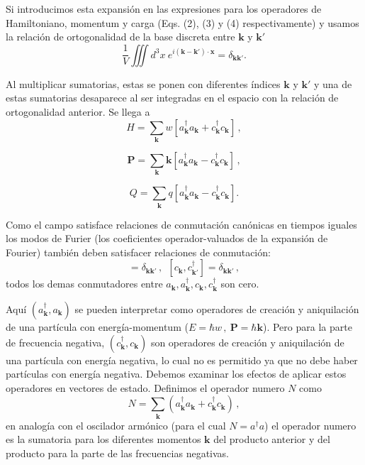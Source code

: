 \documentclass{article}
\begin{document}
Si introducimos esta expansión en las expresiones para los operadores de Hamiltoniano, momentum y carga (Eqs. (2), (3) y (4) respectivamente) y usamos la relación de ortogonalidad de la base discreta entre $\mathbf{k}$ y $\mathbf{k'}$
%
\begin{equation}
  \frac{1}{V}\iiint  d^3x \   e^{i(\mathbf{k}-\mathbf{k'}) \cdot \mathbf{x}}=\delta_{\mathbf{kk'}}.
\end{equation}

Al multiplicar sumatorias, estas se ponen con diferentes índices $\mathbf{k}$ y $\mathbf{k'}$ y una de estas sumatorias desaparece al ser integradas en el espacio con la relación de ortogonalidad anterior. Se llega a 
%
\begin{equation}
  H = \sum_{\mathbf{k}} w[a_{\mathbf{k}}^\dagger a_{\mathbf{k}} + c_{\mathbf{k}}^\dagger c_{\mathbf{k}} ]\,,
\end{equation}

\begin{equation}
  \mathbf{P} = \sum_{{\mathbf{k}}} \mathbf{k}[a_{\mathbf{k}}^\dagger a_{\mathbf{k}} - c_{\mathbf{k}}^\dagger c_{\mathbf{k}} ]\,,
\end{equation}

\begin{equation}
  Q = \sum_{{\mathbf{k}}} q[a_{\mathbf{k}}^\dagger a_{\mathbf{k}} - c_{\mathbf{k}}^\dagger c_{\mathbf{k}} ].
\end{equation}

Como el campo satisface  relaciones de conmutación canónicas en tiempos iguales los modos de Furier (los coeficientes operador-valuados de la expansión de Fourier) también deben satisfacer relaciones de conmutación:
%
\begin{equation}
  [a_{\mathbf{k}},a_{{\mathbf{k}}'}^\dagger] = \delta_{\mathbf{kk'}}\,, \ \  [c_{\mathbf{k}},c_{{\mathbf{k}}'}^\dagger] = \delta_{\mathbf{kk'}}\,, 
\end{equation}
%
todos los demas conmutadores entre $a_{\mathbf{k}},a_{\mathbf{k}}^\dagger,c_{\mathbf{k}},c_{\mathbf{k}}^\dagger$ son cero. 

Aquí $(a_{\mathbf{k}}^\dagger, a_{\mathbf{k}})$ se pueden interpretar como operadores de creación y aniquilación de una partícula con energía-momentum ($E=\hbar w \,, \ \mathbf{P}=\hbar \mathbf{k} $). Pero para la parte de frecuencia negativa,   $(c_{\mathbf{k}}^\dagger, c_{\mathbf{k}})$ son operadores de creación y aniquilación de una partícula con energía negativa, lo cual no es permitido ya que no debe haber partículas con energía negativa. Debemos examinar los efectos de aplicar estos operadores en vectores de estado. Definimos el operador numero $N$ como
%
\begin{equation}
  N= \sum_{\mathbf{k}}(a_{\mathbf{k}}^\dagger a_{\mathbf{k}} + c_{\mathbf{k}}^\dagger c_{\mathbf{k}} )\,,
\end{equation}
en analogía con el oscilador armónico (para el cual $N=a^\dagger a$) el operador numero es la sumatoria para los diferentes momentos $\mathbf{k}$ del producto anterior y del producto para la parte de las frecuencias negativas.
\end{document}
